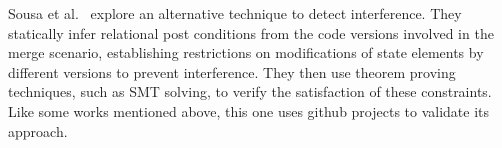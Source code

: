 \documentclass[sigconf,review]{acmart}
\begin{document}
Sousa et al.~\cite{sousa2018verified} explore an alternative technique to detect interference. They statically infer relational post conditions from the code versions involved in the merge scenario, establishing restrictions on modifications of state elements by different versions to prevent interference. They then use theorem proving techniques, such as SMT solving, to verify the satisfaction of these constraints. Like some works mentioned above, this one uses github projects to validate its approach.




\end{document}
